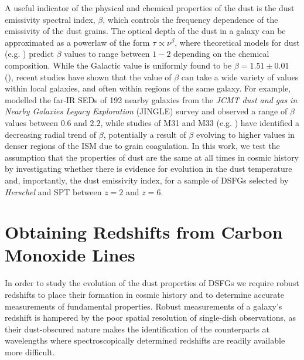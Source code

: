 A useful indicator of the physical and chemical properties of the dust is the dust emissivity spectral index, $\beta$, which controls the frequency dependence of the emissivity of the dust grains. The optical depth of the dust in a galaxy can be approximated as a powerlaw of the form $\tau \propto \nu^\beta$, where theoretical models for dust (e.g. \citealt{Draine_1984, Draine_2011, Kohler_2015}) predict $\beta$ values to range between $1 - 2$ depending on the chemical composition. While the Galactic value is uniformly found to be $\beta = 1.51\pm0.01$ (\citealt{Planck_Collaboration_2015}), recent studies have shown that the value of $\beta$ can take a wide variety of values within local galaxies, and often within regions of the same galaxy. For example, \citealt{Lamperti_2019} modelled the far-IR SEDs of 192 nearby galaxies from the \textit{JCMT dust and gas in Nearby Galaxies Legacy Exploration} (JINGLE) survey and observed a range of $\beta$ values between $0.6$ and $2.2$, while studies of M31 and M33 (e.g. \citealt{Smith_2012, Draine_2014, Tabatabaei_2014, Whitworth_2019, Athikkat-Eknath_2022, Clark_2023}) have identified a decreasing radial trend of $\beta$, potentially a result of $\beta$ evolving to higher values in denser regions of the ISM due to grain coagulation. In this work, we test the assumption that the properties of dust are the same at all times in cosmic history by investigating whether there is evidence for evolution in the dust temperature and, importantly, the dust emissivity index, for a sample of DSFGs selected by \textit{Herschel} and SPT between $z = 2$ and $z = 6$.

\section{Obtaining Redshifts from Carbon Monoxide Lines}

In order to study the evolution of the dust properties of DSFGs we require robust redshifts to place their formation in cosmic history and to determine accurate measurements of fundamental properties. Robust measurements of a galaxy's redshift is hampered by the poor spatial resolution of single-dish observations, as their dust-obscured nature makes the identification of the counterparts at wavelengths where spectroscopically determined redshifts are readily available more difficult.

